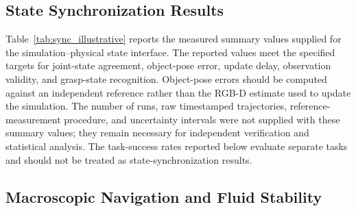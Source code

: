 \subsection{State Synchronization Results}
\label{subsec:state_sync_eval}
Table~\ref{tab:sync_illustrative} reports the measured summary values supplied for the simulation--physical state interface. The reported values meet the specified targets for joint-state agreement, object-pose error, update delay, observation validity, and grasp-state recognition. Object-pose errors should be computed against an independent reference rather than the RGB-D estimate used to update the simulation. The number of runs, raw timestamped trajectories, reference-measurement procedure, and uncertainty intervals were not supplied with these summary values; they remain necessary for independent verification and statistical analysis. The task-success rates reported below evaluate separate tasks and should not be treated as state-synchronization results.

\begin{table}[!t]
\caption{State synchronization targets and reported measured results}
\label{tab:sync_illustrative}
\centering
{}
\end{table}

\subsection{Macroscopic Navigation and Fluid Stability}
\label{subsec:exp_macro_benchmarks}

